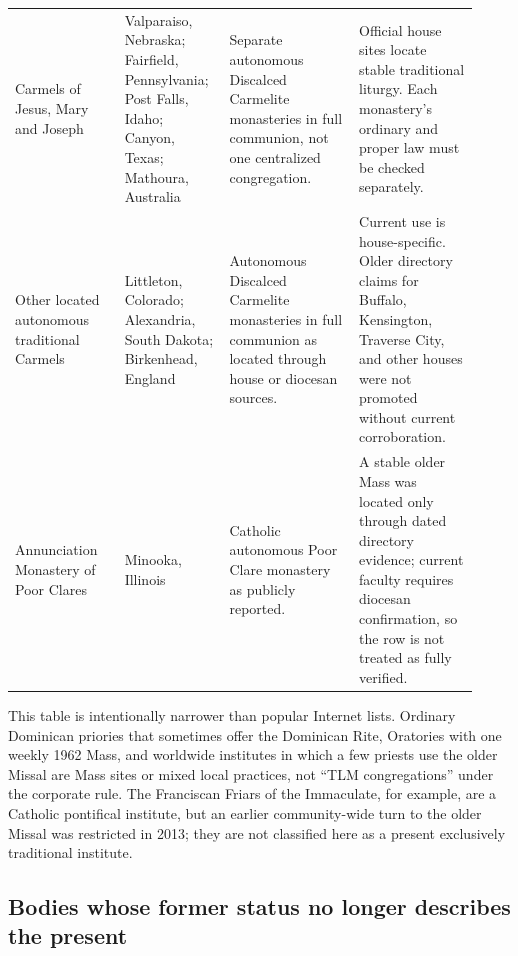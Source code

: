 \begin{longtable}{>{\bfseries\raggedright\arraybackslash}p{0.22\linewidth}>{\raggedright\arraybackslash}p{0.20\linewidth}>{\raggedright\arraybackslash}p{0.26\linewidth}>{\raggedright\arraybackslash}p{0.24\linewidth}}
Carmels of Jesus, Mary and Joseph & Valparaiso, Nebraska; Fairfield, Pennsylvania; Post Falls, Idaho; Canyon, Texas; Mathoura, Australia & Separate autonomous Discalced Carmelite monasteries in full communion, not one centralized congregation. & Official house sites locate stable traditional liturgy. Each monastery's ordinary and proper law must be checked separately.\\
Other located autonomous traditional Carmels & Littleton, Colorado; Alexandria, South Dakota; Birkenhead, England & Autonomous Discalced Carmelite monasteries in full communion as located through house or diocesan sources. & Current use is house-specific. Older directory claims for Buffalo, Kensington, Traverse City, and other houses were not promoted without current corroboration.\\
Annunciation Monastery of Poor Clares & Minooka, Illinois & Catholic autonomous Poor Clare monastery as publicly reported. & A stable older Mass was located only through dated directory evidence; current faculty requires diocesan confirmation, so the row is not treated as fully verified.\\
\bottomrule
\end{longtable}

This table is intentionally narrower than popular Internet lists. Ordinary Dominican priories that sometimes offer the Dominican Rite, Oratories with one weekly 1962 Mass, and worldwide institutes in which a few priests use the older Missal are Mass sites or mixed local practices, not “TLM congregations” under the corporate rule. The Franciscan Friars of the Immaculate, for example, are a Catholic pontifical institute, but an earlier community-wide turn to the older Missal was restricted in 2013; they are not classified here as a present exclusively traditional institute.

\subsection{Bodies whose former status no longer describes the present}

